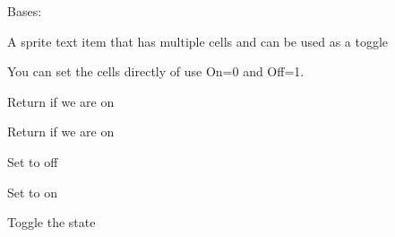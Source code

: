 \documentclass[letterpaper,10pt,english]{sphinxmanual}
\begin{document}
\begin{fulllineitems}
\label{blocks:serge.blocks.visualblocks.TextToggle}
Bases: {\hyperref[blocks:serge.blocks.visualblocks.SpriteText]{}}

A sprite text item that has multiple cells and can be used as a toggle

You can set the cells directly of use On=0 and Off=1.

\begin{fulllineitems}
\label{blocks:serge.blocks.visualblocks.TextToggle.isOff}
Return if we are on

\end{fulllineitems}


\begin{fulllineitems}
\label{blocks:serge.blocks.visualblocks.TextToggle.isOn}
Return if we are on

\end{fulllineitems}


\begin{fulllineitems}
\label{blocks:serge.blocks.visualblocks.TextToggle.setOff}
Set to off

\end{fulllineitems}


\begin{fulllineitems}
\label{blocks:serge.blocks.visualblocks.TextToggle.setOn}
Set to on

\end{fulllineitems}


\begin{fulllineitems}
\label{blocks:serge.blocks.visualblocks.TextToggle.toggle}
Toggle the state

\end{fulllineitems}


\end{fulllineitems}
\end{document}
